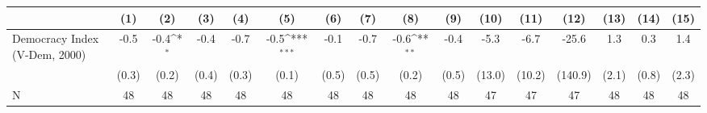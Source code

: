 {
\def\sym#1{\ifmmode^{#1}\else\(^{#1}\)\fi}
\begin{tabular}{l*{15}{c}}
\hline\hline
                    &\multicolumn{1}{c}{(1)}         &\multicolumn{1}{c}{(2)}         &\multicolumn{1}{c}{(3)}         &\multicolumn{1}{c}{(4)}         &\multicolumn{1}{c}{(5)}         &\multicolumn{1}{c}{(6)}         &\multicolumn{1}{c}{(7)}         &\multicolumn{1}{c}{(8)}         &\multicolumn{1}{c}{(9)}         &\multicolumn{1}{c}{(10)}         &\multicolumn{1}{c}{(11)}         &\multicolumn{1}{c}{(12)}         &\multicolumn{1}{c}{(13)}         &\multicolumn{1}{c}{(14)}         &\multicolumn{1}{c}{(15)}         \\
\hline
Democracy Index (V-Dem, 2000)&        -0.5         &        -0.4\sym{*}  &        -0.4         &        -0.7         &        -0.5\sym{***}&        -0.1         &        -0.7         &        -0.6\sym{**} &        -0.4         &        -5.3         &        -6.7         &       -25.6         &         1.3         &         0.3         &         1.4         \\
                    &       (0.3)         &       (0.2)         &       (0.4)         &       (0.3)         &       (0.1)         &       (0.5)         &       (0.5)         &       (0.2)         &       (0.5)         &      (13.0)         &      (10.2)         &     (140.9)         &       (2.1)         &       (0.8)         &       (2.3)         \\
\hline
N                   &          48         &          48         &          48         &          48         &          48         &          48         &          48         &          48         &          48         &          47         &          47         &          47         &          48         &          48         &          48         \\
\hline\hline
\end{tabular}
}

